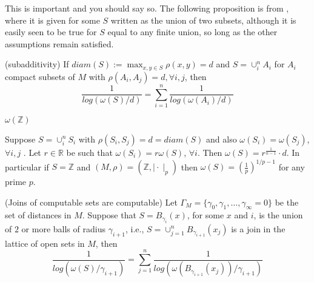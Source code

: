 This is important and you should say so. The following proposition is from \cite{kj}, where it is given for some $S$  written as the union of two subsets, although it is easily seen to be true for $S$ equal to any finite union, so long as the other assumptions remain satisfied.

\begin{proposition}
	\cite{kj}(subadditivity) If  $diam(S) := \max_{x,y \in S} \rho(x,y)=d$ and $S=\cup_i^n A_i$ for $A_i$ compact subsets of $M$ with $\rho(A_i, A_j)=d, \forall i,j$, then \[\frac{1}{log(\omega(S)/d) } = \sum_{i=1}^n \frac{1}{log(\omega(A_i)/d)}\] 
\end{proposition}


\begin{example}
$\omega(\mathbb{Z})$
\end{example}

\begin{corollary}
	Suppose $S = \cup_i^n S_i$ with $\rho(S_i, S_j)=d=diam(S)$ and also $\omega(S_i)=\omega(S_j)$, $\forall i,j$ .  Let $r \in \mathbb{R}$ be such that $\omega(S_i)=r\omega(S)$, $\forall i$. Then $\omega(S) = r^{\frac{1}{n-1}}\cdot d$. In particular if $S = \mathbb{Z}$ and $(M,\rho)= (\mathbb{Z}, \mid \cdot\mid_p)$ then $\omega(S)=(\frac{1}{p})^{1/p-1}$ for any prime $p$. 
\end{corollary}

\begin{example}
\end{example}

\begin{corollary}
	(Joins of computable sets are computable) Let  $\Gamma_M = \{\gamma_0, \gamma_1,\ldots, \gamma_\infty=0\}$ be the set of distances in $M$. Suppose that $S = B_{\gamma_i}(x)$,  for some $x$ and $i$, is the union of $2$ or more balls of radius $\gamma_{i+1}$, i.e., $S=\cup_{j=1}^n B_{\gamma_{i+1}} (x_j)$ is a join in the lattice of open sets in $M$, then 
	\[\frac{1}{log(\omega(S)/\gamma_{i+1} )} = \sum_{j=1}^n \frac{1}{log(\omega(B_{\gamma_{i+1}}(x_j))/\gamma_{i+1} )}\]
\end{corollary}

